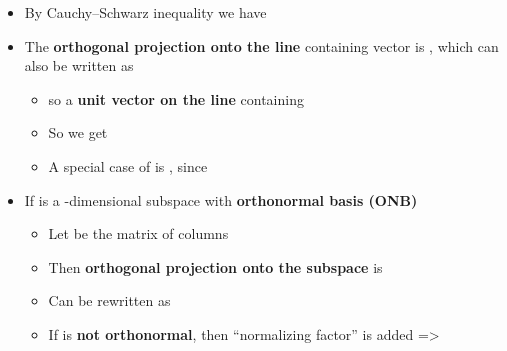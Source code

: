 \begin{itemize}

  \item
        By
        Cauchy--Schwarz inequality we have 
  \item
        The \textbf{orthogonal projection onto the line} containing vector
         is ,
        which can also be written as

        \begin{itemize}

          \item
                 so  a
                \textbf{unit vector on the line} containing 
          \item
                So we get
          \item
                A special case of  is
                , since
        \end{itemize}
  \item
        If  is a -dimensional
        subspace with \textbf{orthonormal basis (ONB)}

        \begin{itemize}

          \item
                Let
                be the matrix of columns 
          \item
                Then \textbf{orthogonal projection onto the subspace}  is
          \item
                Can be rewritten as
          \item
                If  is
                \textbf{not orthonormal}, then ``normalizing factor''
                 is added =\textgreater{}


\end{itemize}
\end{itemize}
